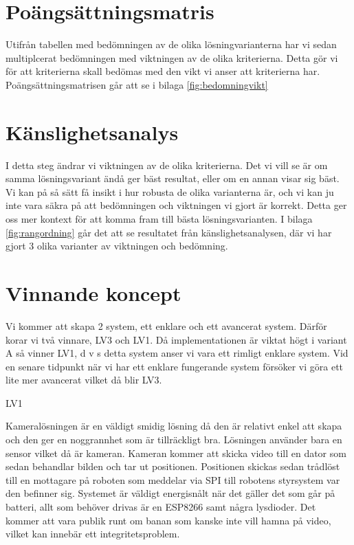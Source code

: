 \documentclass[11pt, a4paper]{report}
\begin{document}
\section{Poängsättningsmatris}

Utifrån tabellen med bedömningen av de olika lösningvarianterna har vi sedan multiplcerat bedömningen med viktningen av de olika kriterierna. Detta gör vi för att kriterierna skall bedömas med den vikt vi anser att kriterierna har. Poängsättningsmatrisen går att se i bilaga \ref{fig:bedomningvikt}

\section{Känslighetsanalys}

I detta steg ändrar vi viktningen av de olika kriterierna. Det vi vill se är om samma lösningsvariant ändå ger bäst resultat, eller om en annan visar sig bäst. Vi kan på så sätt få insikt i hur robusta de olika varianterna är, och vi kan ju inte vara säkra på att bedömningen och viktningen vi gjort är korrekt. Detta ger oss mer kontext för att komma fram till bästa lösningsvarianten. I bilaga \ref{fig:rangordning} går det att se resultatet från känslighetsanalysen, där vi har gjort 3 olika varianter av viktningen och bedömning.

\section{Vinnande koncept}

Vi kommer att skapa 2 system, ett enklare och ett avancerat system. Därför korar vi två vinnare, LV3 och LV1. Då implementationen är viktat högt i variant A så vinner LV1, d v s detta system anser vi vara ett rimligt enklare system. Vid en senare tidpunkt när vi har ett enklare fungerande system försöker vi göra ett lite mer avancerat vilket då blir LV3.


LV1

Kameralösningen är en väldigt smidig lösning då den är relativt enkel att skapa och den ger en noggrannhet som är tillräckligt bra. Lösningen använder bara en sensor vilket då är kameran.
Kameran kommer att skicka video till en dator som sedan behandlar bilden och tar ut positionen. Positionen skickas sedan trådlöst till en mottagare på roboten som meddelar via SPI till robotens styrsystem var den befinner sig. Systemet är väldigt energisnålt när det gäller det som går på batteri, allt som behöver drivas är en ESP8266 samt några lysdioder. Det kommer att vara publik runt om banan som kanske inte vill hamna på video, vilket kan innebär ett integritetsproblem.
\end{document}
